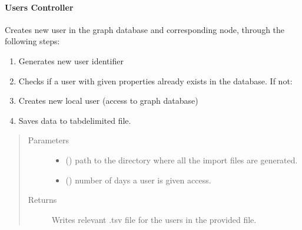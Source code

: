 \documentclass[letterpaper,10pt,english]{sphinxmanual}
\begin{document}
\paragraph{Users Controller}
\label{\detokenize{_autosummary/graphdb_builder.users:module-graphdb_builder.users.users_controller}}\label{\detokenize{_autosummary/graphdb_builder.users:users-controller}}

\begin{fulllineitems}
\label{\detokenize{_autosummary/graphdb_builder.users:graphdb_builder.users.users_controller.parseUsersFile}}
Creates new user in the graph database and corresponding node, through the following steps:
\begin{enumerate}
%
\item {} 
Generates new user identifier

\item {} 
Checks if a user with given properties already exists in the database. If not:

\item {} 
Creates new local user (access to graph database)

\item {} 
Saves data to tab\sphinxhyphen{}delimited file.

\end{enumerate}
\begin{quote}\begin{description}
\item[{Parameters}] \leavevmode\begin{itemize}
\item {} 
 () \textendash{} path to the directory where all the import files are generated.

\item {} 
 () \textendash{} number of days a user is given access.

\end{itemize}

\item[{Returns}] \leavevmode
Writes relevant .tsv file for the users in the provided file.

\end{description}\end{quote}

\end{fulllineitems}
\end{document}
